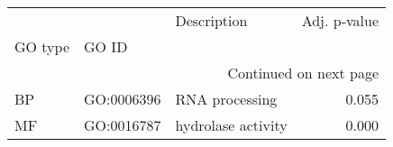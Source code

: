 \begin{longtable}{lllr}
\toprule
   &            &         Description &  Adj. p-value \\
GO type & GO ID &                     &               \\
\midrule
\endhead
\midrule
\multicolumn{4}{r}{{Continued on next page}} \\
\midrule
\endfoot

\bottomrule
\endlastfoot
BP & GO:0006396 &      RNA processing &         0.055 \\
MF & GO:0016787 &  hydrolase activity &         0.000 \\
\end{longtable}
